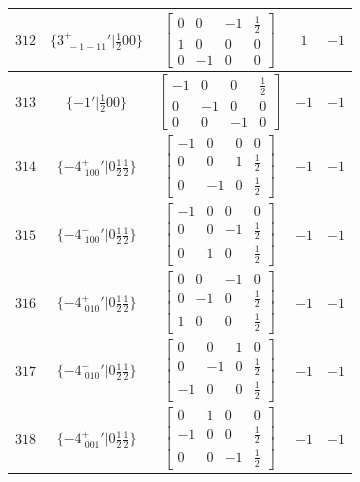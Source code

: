 \documentclass[fleqn,8pt]{jsarticle}
\begin{document}
\begin{longtable}{ccccc}
$ 312 $ & $ \{3^{+}_{\,\,-1-11}{}'|\frac{1}{2} 0 0\} $ & $ \begin{bmatrix} 0 & 0 & -1 & \frac{1}{2} \\ 1 & 0 & 0 & 0 \\ 0 & -1 & 0 & 0 \end{bmatrix} $ & $ 1 $ & $ -1 $ \\ \hline
$ 313 $ & $ \{-1{}'|\frac{1}{2} 0 0\} $ & $ \begin{bmatrix} -1 & 0 & 0 & \frac{1}{2} \\ 0 & -1 & 0 & 0 \\ 0 & 0 & -1 & 0 \end{bmatrix} $ & $ -1 $ & $ -1 $ \\ \hline
$ 314 $ & $ \{-4^{+}_{\,\,100}{}'|0 \frac{1}{2} \frac{1}{2}\} $ & $ \begin{bmatrix} -1 & 0 & 0 & 0 \\ 0 & 0 & 1 & \frac{1}{2} \\ 0 & -1 & 0 & \frac{1}{2} \end{bmatrix} $ & $ -1 $ & $ -1 $ \\ \hline
$ 315 $ & $ \{-4^{-}_{\,\,100}{}'|0 \frac{1}{2} \frac{1}{2}\} $ & $ \begin{bmatrix} -1 & 0 & 0 & 0 \\ 0 & 0 & -1 & \frac{1}{2} \\ 0 & 1 & 0 & \frac{1}{2} \end{bmatrix} $ & $ -1 $ & $ -1 $ \\ \hline
$ 316 $ & $ \{-4^{+}_{\,\,010}{}'|0 \frac{1}{2} \frac{1}{2}\} $ & $ \begin{bmatrix} 0 & 0 & -1 & 0 \\ 0 & -1 & 0 & \frac{1}{2} \\ 1 & 0 & 0 & \frac{1}{2} \end{bmatrix} $ & $ -1 $ & $ -1 $ \\ \hline
$ 317 $ & $ \{-4^{-}_{\,\,010}{}'|0 \frac{1}{2} \frac{1}{2}\} $ & $ \begin{bmatrix} 0 & 0 & 1 & 0 \\ 0 & -1 & 0 & \frac{1}{2} \\ -1 & 0 & 0 & \frac{1}{2} \end{bmatrix} $ & $ -1 $ & $ -1 $ \\ \hline
$ 318 $ & $ \{-4^{+}_{\,\,001}{}'|0 \frac{1}{2} \frac{1}{2}\} $ & $ \begin{bmatrix} 0 & 1 & 0 & 0 \\ -1 & 0 & 0 & \frac{1}{2} \\ 0 & 0 & -1 & \frac{1}{2} \end{bmatrix} $ & $ -1 $ & $ -1 $ \\ \hline

\end{longtable}
\end{document}
